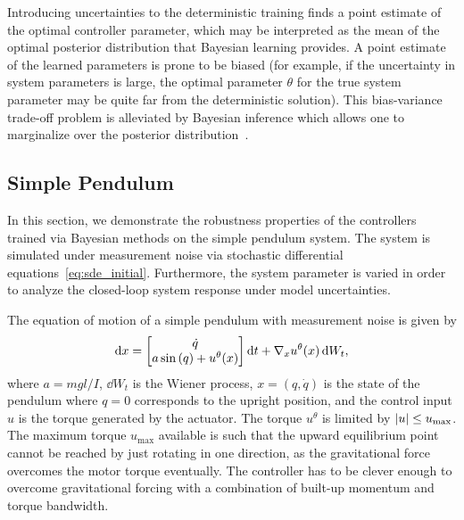 \begin{rem}
    Introducing uncertainties to the deterministic training finds a point
    estimate of the optimal controller parameter, which may be interpreted as
    the mean of the optimal posterior distribution that Bayesian learning
    provides. A point estimate of the learned parameters is prone to be biased
    (for example, if the uncertainty in system parameters is large, the optimal
    parameter $\theta$ for the true system parameter may be quite far from the
    deterministic solution). This bias-variance trade-off problem is alleviated
    by Bayesian inference which allows one to marginalize over the posterior
    distribution~\cite{bishop2006pattern}.
\end{rem}




\subsection{Simple Pendulum}

In this section, we demonstrate the robustness properties of the controllers
trained via Bayesian methods on the simple pendulum system. The system is
simulated under measurement noise via stochastic differential
equations~\eqref{eq:sde_initial}. Furthermore, the system parameter is varied in
order to analyze the closed-loop system response under model uncertainties. 

The equation of motion of a simple pendulum with measurement noise is given by
%
\begin{equation}
    \operatorname{d}\! x = \begin{bmatrix}
        \dot{q} \\ 
        a \sin{(q)} + u^\theta(x)
    \end{bmatrix} \operatorname{d}\! t+ \nabla_x u^\theta(x) \operatorname{d}\! W_t,
    \label{eq:pendulum_sde}
\end{equation}
%
where $a=mgl/I$, $\dd W_t$ is the Wiener process, $x = (q,
\dot{q})$ is the state of the pendulum where $q = 0$ corresponds
to the upright position, and the control input $u$ is the torque generated by
the actuator. 
%
The torque \(u^\theta\) is limited by \(\left|{u}\right| \leq u_{\textrm{max}}\).
%
The maximum torque $u_{\textrm{max}}$ available is such that the upward
equilibrium point cannot be reached by just rotating in one direction, as the
gravitational force overcomes the motor torque eventually. The controller has to
be clever enough to overcome gravitational forcing with a combination of
built-up momentum and torque bandwidth.

